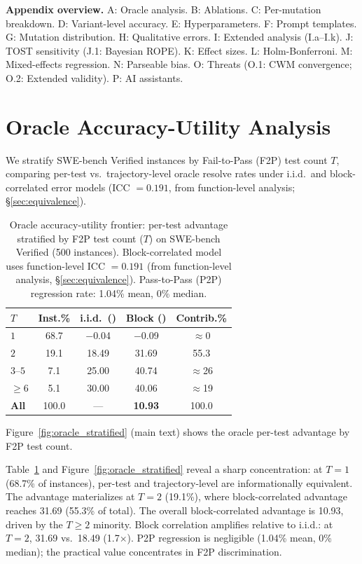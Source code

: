\appendix

\noindent\textbf{Appendix overview.} A: Oracle analysis. B: Ablations. C: Per-mutation breakdown. D: Variant-level accuracy. E: Hyperparameters. F: Prompt templates. G: Mutation distribution. H: Qualitative errors. I: Extended analysis (I.a--I.k). J: TOST sensitivity (J.1: Bayesian ROPE). K: Effect sizes. L: Holm-Bonferroni. M: Mixed-effects regression. N: Parseable bias. O: Threats (O.1: CWM convergence; O.2: Extended validity). P: AI assistants.

\section{Oracle Accuracy-Utility Analysis}
\label{app:oracle}

We stratify SWE-bench Verified instances by Fail-to-Pass (F2P) test count $T$, comparing per-test vs.\ trajectory-level oracle resolve rates under i.i.d.\ and block-correlated error models (ICC $= 0.191$, from function-level analysis; \S\ref{sec:equivalence}).

\begin{table}[h]
\centering
\small
\caption{Oracle accuracy-utility frontier: per-test advantage stratified by F2P test count ($T$) on SWE-bench Verified (500 instances). Block-correlated model uses function-level ICC $= 0.191$ (from function-level analysis, \S\ref{sec:equivalence}). Pass-to-Pass (P2P) regression rate: 1.04\% mean, 0\% median.}
\label{tab:oracle}
\setlength{\tabcolsep}{6pt}
\begin{tabular}{lcccc}
\toprule
\textbf{$T$} & \textbf{Inst.\%} & \textbf{i.i.d.\ (\pp{})} & \textbf{Block (\pp{})} & \textbf{Contrib.\%} \\
\midrule
$1$ & 68.7 & $-$0.04 & $-$0.09 & $\approx$0 \\
$2$ & 19.1 & 18.49 & 31.69 & 55.3 \\
$3$--$5$ & 7.1 & 25.00 & 40.74 & $\approx$26 \\
$\geq 6$ & 5.1 & 30.00 & 40.06 & $\approx$19 \\
\midrule
\textbf{All} & 100.0 & --- & \textbf{10.93} & 100.0 \\
\bottomrule
\end{tabular}
\end{table}

Figure~\ref{fig:oracle_stratified} (main text) shows the oracle per-test advantage by F2P test count.

Table~\ref{tab:oracle} and Figure~\ref{fig:oracle_stratified} reveal a sharp concentration: at $T = 1$ (68.7\% of instances), per-test and trajectory-level are informationally equivalent. The advantage materializes at $T = 2$ (19.1\%), where block-correlated advantage reaches 31.69\pp{} (55.3\% of total). The overall block-correlated advantage is 10.93\pp{}, driven by the $T \geq 2$ minority. Block correlation amplifies relative to i.i.d.: at $T = 2$, 31.69\pp{} vs.\ 18.49\pp{} (1.7$\times$). P2P regression is negligible (1.04\% mean, 0\% median); the practical value concentrates in F2P discrimination.

